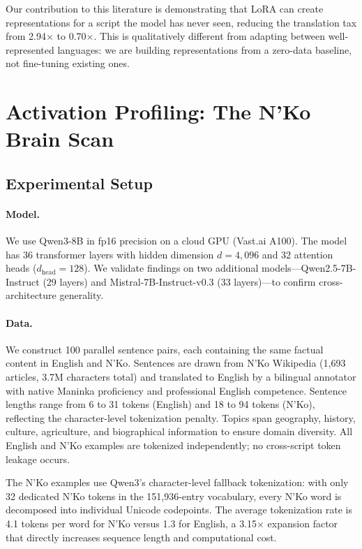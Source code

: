 \documentclass[11pt]{article}
\begin{document}
Our contribution to this literature is demonstrating that LoRA can create representations for a script the model has never seen, reducing the translation tax from 2.94$\times$ to 0.70$\times$.
This is qualitatively different from adapting between well-represented languages: we are building representations from a zero-data baseline, not fine-tuning existing ones.

\section{Activation Profiling: The N'Ko Brain Scan}
\label{sec:brain-scan}

\subsection{Experimental Setup}

\paragraph{Model.}
We use Qwen3-8B in fp16 precision on a cloud GPU (Vast.ai A100).
The model has 36 transformer layers with hidden dimension $d = 4{,}096$ and 32 attention heads ($d_{\text{head}} = 128$).
We validate findings on two additional models---Qwen2.5-7B-Instruct (29 layers) and Mistral-7B-Instruct-v0.3 (33 layers)---to confirm cross-architecture generality.

\paragraph{Data.}
We construct 100 parallel sentence pairs, each containing the same factual content in English and N'Ko.
Sentences are drawn from N'Ko Wikipedia (1,693 articles, 3.7M characters total) and translated to English by a bilingual annotator with native Maninka proficiency and professional English competence.
Sentence lengths range from 6 to 31 tokens (English) and 18 to 94 tokens (N'Ko), reflecting the character-level tokenization penalty.
Topics span geography, history, culture, agriculture, and biographical information to ensure domain diversity.
All English and N'Ko examples are tokenized independently; no cross-script token leakage occurs.

The N'Ko examples use Qwen3's character-level fallback tokenization: with only 32 dedicated N'Ko tokens in the 151,936-entry vocabulary, every N'Ko word is decomposed into individual Unicode codepoints.
The average tokenization rate is 4.1 tokens per word for N'Ko versus 1.3 for English, a 3.15$\times$ expansion factor that directly increases sequence length and computational cost.
\end{document}
